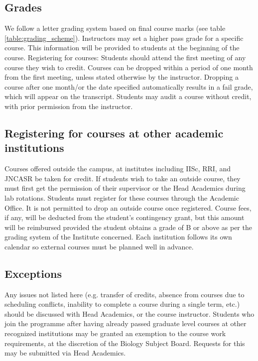 \documentclass[a4paper]{extarticle}
\begin{document}
\subsection{Grades}
We follow a letter grading system based on final course marks (see table
\ref{table:grading_scheme}).
Instructors may set a higher pass grade for a specific course. This information will be
provided to students at the beginning of the course.
Registering for courses: Students should attend the first meeting of any course they wish to
credit. Courses can be dropped within a period of one month from the first meeting, unless
stated otherwise by the instructor. Dropping a course after one month/or the date specified
automatically results in a fail grade, which will appear on the transcript. Students may audit
a course without credit, with prior permission from the instructor.

\subsection{Registering for courses at other academic institutions} Courses
offered outside the campus, at institutes including IISc, RRI, and JNCASR be
taken for credit. If students wish to take an outside course, they must first
get the permission of their supervisor or the Head Academics during lab
rotations. Students must register for these courses through the Academic Office.
It is not permitted to drop an outside course once registered. Course fees, if
any, will be deducted from the student’s contingency grant, but this amount will
be reimbursed provided the student obtains a grade of B or above as per the
grading system of the Institute concerned. Each institution follows its own
calendar so external courses must be planned well in advance.

\subsection{Exceptions} Any issues not listed here (e.g. transfer of credits,
absence from courses due to scheduling conflicts, inability to complete a course
during a single term, etc.) should be discussed with Head Academics, or the
course instructor. Students who join the programme after having already passed
graduate level courses at other recognized institutions may be granted an
exemption to the course work requirements, at the discretion of the Biology
Subject Board. Requests for this may be submitted via Head Academics. 
\end{document}
